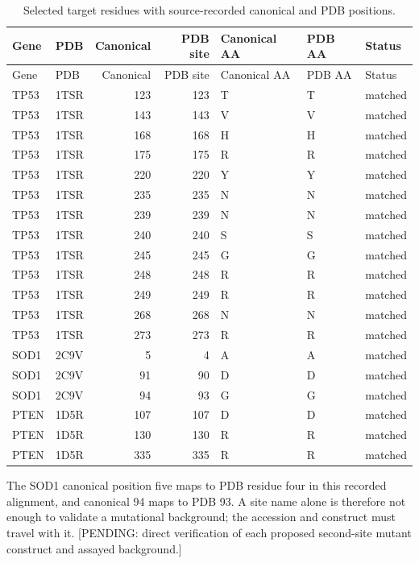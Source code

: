 \begin{longtable}{llrrlll}
\caption{Selected target residues with source-recorded canonical and PDB positions.}\label{tab:sites}\\
\hline Gene & PDB & Canonical & PDB site & Canonical AA & PDB AA & Status\\\hline\endfirsthead
\hline Gene & PDB & Canonical & PDB site & Canonical AA & PDB AA & Status\\\hline\endhead
TP53 & 1TSR & 123 & 123 & T & T & matched\\
TP53 & 1TSR & 143 & 143 & V & V & matched\\
TP53 & 1TSR & 168 & 168 & H & H & matched\\
TP53 & 1TSR & 175 & 175 & R & R & matched\\
TP53 & 1TSR & 220 & 220 & Y & Y & matched\\
TP53 & 1TSR & 235 & 235 & N & N & matched\\
TP53 & 1TSR & 239 & 239 & N & N & matched\\
TP53 & 1TSR & 240 & 240 & S & S & matched\\
TP53 & 1TSR & 245 & 245 & G & G & matched\\
TP53 & 1TSR & 248 & 248 & R & R & matched\\
TP53 & 1TSR & 249 & 249 & R & R & matched\\
TP53 & 1TSR & 268 & 268 & N & N & matched\\
TP53 & 1TSR & 273 & 273 & R & R & matched\\
SOD1 & 2C9V & 5 & 4 & A & A & matched\\
SOD1 & 2C9V & 91 & 90 & D & D & matched\\
SOD1 & 2C9V & 94 & 93 & G & G & matched\\
PTEN & 1D5R & 107 & 107 & D & D & matched\\
PTEN & 1D5R & 130 & 130 & R & R & matched\\
PTEN & 1D5R & 335 & 335 & R & R & matched\\
\hline\end{longtable}
The SOD1 canonical position five maps to PDB residue four in this recorded alignment, and canonical 94 maps to PDB 93. A site name alone is therefore not enough to validate a mutational background; the accession and construct must travel with it. [PENDING: direct verification of each proposed second-site mutant construct and assayed background.]

